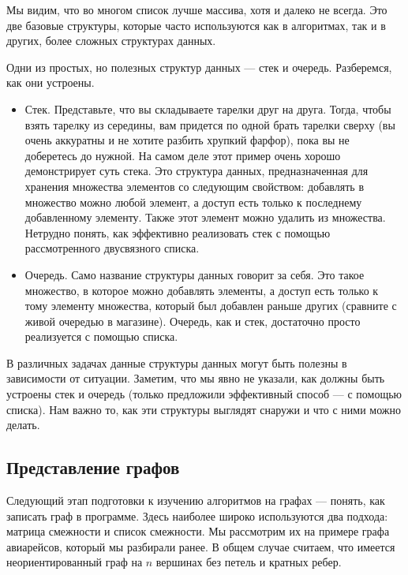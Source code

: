 Мы видим, что во многом список лучше массива, хотя и далеко не всегда.
Это две базовые структуры, которые часто используются как в алгоритмах,
так и в других, более сложных структурах данных.

Одни из простых, но полезных структур данных --- стек и очередь. Разберемся,
как они устроены.

\begin{itemize}
    \item Стек. Представьте, что вы складываете тарелки друг на друга.
        Тогда, чтобы взять тарелку из середины, вам придется по одной
        брать тарелки сверху (вы очень аккуратны и не хотите разбить
        хрупкий фарфор), пока вы не доберетесь до нужной. На самом деле
        этот пример очень хорошо демонстрирует суть стека. Это структура
        данных, предназначенная для хранения множества элементов со следующим
        свойством: добавлять в множество можно любой элемент, а доступ
        есть только к последнему добавленному элементу. Также этот элемент
        можно удалить из множества. Нетрудно понять, как эффективно реализовать
        стек с помощью рассмотренного двусвязного списка.
    \item Очередь. Само название структуры данных говорит за себя.
        Это такое множество, в которое можно добавлять элементы, а
        доступ есть только к тому элементу множества, который был добавлен
        раньше других (сравните с живой очередью в магазине). Очередь,
        как и стек, достаточно просто реализуется с помощью списка.
\end{itemize}

В различных задачах данные структуры данных могут быть полезны в зависимости
от ситуации. Заметим, что мы явно не указали, как должны быть устроены стек и
очередь (только предложили эффективный способ --- с помощью списка). Нам
важно то, как эти структуры выглядят снаружи и что с ними можно делать.

\subsection{Представление графов}

Следующий этап подготовки к изучению алгоритмов на графах --- понять, как
записать граф в программе. Здесь наиболее широко используются два подхода:
матрица смежности и список смежности. Мы рассмотрим их на примере графа
авиарейсов, который мы разбирали ранее. В общем случае считаем, что имеется
неориентированный граф на $n$ вершинах без петель и кратных ребер.

